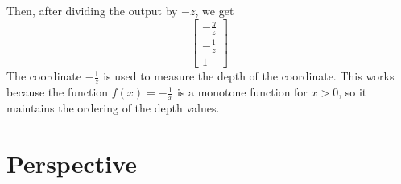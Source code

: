 \documentclass[letterpaper,12pt]{article}
\begin{document}
Then, after dividing the output by $-z$, we get
\begin{equation*}
    \begin{bmatrix} -\frac{y}{z} \\ -\frac{1}{z} \\ 1 \end{bmatrix}
\end{equation*}
The coordinate $-\frac{1}{z}$ is used to measure the depth of the coordinate. This works because the function $f(x) = -\frac{1}{x}$ is a monotone function for $x > 0$, so it maintains the ordering of the depth values.

\section*{Perspective}
\end{document}
